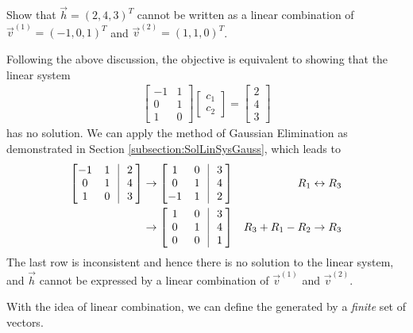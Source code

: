 \begin{exmp}
Show that $\vec{h} = (2,4,3)^T$ cannot be written as a linear combination of $\vec{v}^{(1)} = (-1, 0, 1)^T$ and $\vec{v}^{(2)} = (1, 1, 0)^T$.
\end{exmp}
\begin{solution}
Following the above discussion, the objective is equivalent to showing that the linear system
\begin{align*}
\begin{bmatrix}
-1 & 1 \\
0 & 1 \\
1 & 0
\end{bmatrix}
\begin{bmatrix}
c_1 \\
c_2
\end{bmatrix}
=
\begin{bmatrix}
2 \\
4 \\
3
\end{bmatrix}
\end{align*}
has no solution. We can apply the method of Gaussian Elimination as demonstrated in Section \ref{subsection:SolLinSysGauss}, which leads to
\begin{align*}
\left[\begin{array}{@{\,}wc{10pt}wc{10pt}|wc{10pt}@{}}
-1 & 1 & 2\\
0 & 1 & 4\\
1 & 0 & 3
\end{array}\right] 
&\to
\left[\begin{array}{@{\,}wc{10pt}wc{10pt}|wc{10pt}@{}}
1 & 0 & 3 \\
0 & 1 & 4 \\
-1 & 1 & 2
\end{array}\right] & R_1 \leftrightarrow R_3 \\
&\to
\left[\begin{array}{@{\,}wc{10pt}wc{10pt}|wc{10pt}@{}}
1 & 0 & 3 \\
0 & 1 & 4 \\
0 & 0 & 1
\end{array}\right] & R_3 + R_1 - R_2 \to R_3
\end{align*}
The last row is inconsistent and hence there is no solution to the linear system, and $\vec{h}$ cannot be expressed by a linear combination of $\vec{v}^{(1)}$ and $\vec{v}^{(2)}$.
\end{solution}
With the idea of linear combination, we can define the  generated by a \textit{finite} set of vectors.
